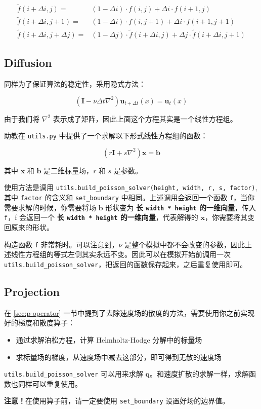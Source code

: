 \documentclass{ctexart}
\begin{document}
\begin{equation}
  \begin{split}
    \tilde f(i+\Delta i,j) = & (1-\Delta i) \cdot f(i, j) + \Delta i \cdot f(i + 1, j) \\
    \tilde f(i+\Delta i,j+1) = & (1-\Delta i) \cdot f(i, j+1) + \Delta i \cdot f(i + 1, j+1) \\
    \tilde f(i+\Delta i,j + \Delta j) = & (1-\Delta j) \cdot \tilde f(i + \Delta i, j) + \Delta j \cdot \tilde f(i + \Delta i, j + 1)
  \end{split}
\end{equation}

\subsection{Diffusion}

同样为了保证算法的稳定性，采用隐式方法：

\begin{equation}
(\textbf{I} - \nu \Delta t \nabla^2) \mathbf{u}_{t+\Delta t}(x) = \mathbf{u}_t (x)
\end{equation}

由于我们将 $\nabla ^ 2$ 表示成了矩阵，因此上面这个方程其实是一个线性方程组。

助教在 \texttt{utils.py} 中提供了一个求解以下形式线性方程组的函数：

\begin{equation}
(r \textbf{I} + s \nabla^2) \mathbf{x} = \mathbf{b}
\end{equation}

其中 $\mathbf{x}$ 和 $\mathbf{b}$ 是二维标量场，$r$ 和 $s$ 是参数。

使用方法是调用 \texttt{utils.build\_poisson\_solver(height, width, r, s, factor)}, 其中 \texttt{factor} 的含义和 \texttt{set\_boundary} 中相同。上述调用会返回一个函数 \texttt{f}，当你需要求解的时候，你需要将场 $\mathbf{b}$ 形状变为 \textbf{长 \texttt{width * height} 的一维向量}，传入 \texttt{f}，f 会返回一个 \textbf{长 \texttt{width * height} 的一维向量}，代表解得的 $\mathbf{x}$，你需要将其变回原来的形状。

构造函数 \texttt{f} 非常耗时。可以注意到，$\nu$ 是整个模拟中都不会改变的参数，因此上述线性方程组的等式左侧其实永远不变。因此可以在模拟开始前调用一次 \texttt{utils.build\_poisson\_solver}，把返回的函数保存起来，之后重复使用即可。

\subsection{Projection}
在 \ref{sec:p-operator} 一节中提到了去除速度场的散度的方法，需要使用你之前实现好的梯度和散度算子：

\begin{itemize}
  \item 通过求解泊松方程，计算 Helmholtz-Hodge 分解中的标量场
  \item 求标量场的梯度，从速度场中减去这部分，即可得到无散的速度场
\end{itemize}

\texttt{utils.build\_poisson\_solver} 可以用来求解 $\mathbf{q}$。和速度扩散的求解一样，求解函数也同样可以重复使用。

\textbf{注意！}在使用算子前，请一定要使用 \texttt{set\_boundary} 设置好场的边界值。
\end{document}
